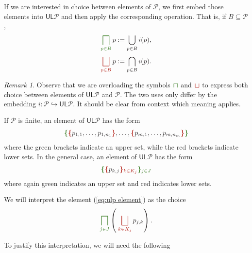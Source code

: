 \documentclass[12pt]{article}
\theoremstyle{definition}
\theoremstyle{plain}
\theoremstyle{plain}
\theoremstyle{plain}
\theoremstyle{plain}
\theoremstyle{remark}
\theoremstyle{remark}
\newtheorem{remark}[definition]{Remark}
\newcommand{\mc}[1]{\mathcal{#1}}
\newcommand{\sub}{\subseteq}
\newcommand{\low}{\mathsf{L}}
\newcommand{\upper}{\mathsf{U}}
\newcommand{\cbigsqcap}[1]{\color{OliveGreen}\bigsqcap_{#1}\color{Black}}
\newcommand{\csqcap}{\color{OliveGreen}\bm{\sqcap}\color{Black}}
\newcommand{\cbigsqcup}[1]{\color{BrickRed}\bigsqcup_{#1}\color{Black}}
\newcommand{\csqcup}{\color{BrickRed}\bm{\sqcup}\color{Black}}
\begin{document}
If we are interested in choice between elements of $\mc{P}$, we first embed those elements into $\upper\low\mc{P}$ and then apply the corresponding operation. That is, if $B \sub \mc{P}$,
$$ \cbigsqcap{p \in B} p :=  \bigcup_{p \in B} i(p),$$
$$ \cbigsqcup{p \in B} p := \bigcap_{p \in B} i(p).$$
\begin{remark}
	Observe that we are overloading the symbols $\csqcap$ and $\csqcup$ to express both choice between elements of $\upper\low\mc{P}$ and $\mc{P}$. The two uses only differ by the embedding $i: \mc{P} \hookrightarrow \upper\low\mc{P}$. It should be clear from context which meaning applies. 
\end{remark}

If $\mc{P}$ is finite, an element of $\upper\low\mc{P}$ has the form
$$\color{OliveGreen} \bm{\{} \color{Black} \color{BrickRed} \bm{\{} \color{Black} p_{1,1}, \ldots, p_{1,n_1} \color{BrickRed} \bm{\}} \color{Black}, \ldots, \color{BrickRed} \bm{\{} \color{Black} p_{m,1}, \ldots, p_{m,n_m} \color{BrickRed} \bm{\}} \color{Black}  \color{OliveGreen} \bm{\}} \color{Black}$$
where the green brackets indicate an upper set, while the red brackets indicate lower sets. In the general case, an element of $\upper\low\mc{P}$ has the form
\begin{equation}\label{eq:ulp element}
	\color{OliveGreen} \bm{\{} \color{Black} \color{BrickRed} \bm{\{} \color{Black} p_{k,j} \color{BrickRed} \bm{\}}_{k \in K_j} \color{Black}  \color{OliveGreen} \bm{\}}_{j \in J} \color{Black}
\end{equation}
where again green indicates an upper set and red indicates lower sets.

We will interpret the element (\ref{eq:ulp element}) as the choice
$$\cbigsqcap{j \in J} \left( \: \cbigsqcup{k \in K_j} p_{j,k} \right).$$

To justify this interpretation, we will need the following
\end{document}
